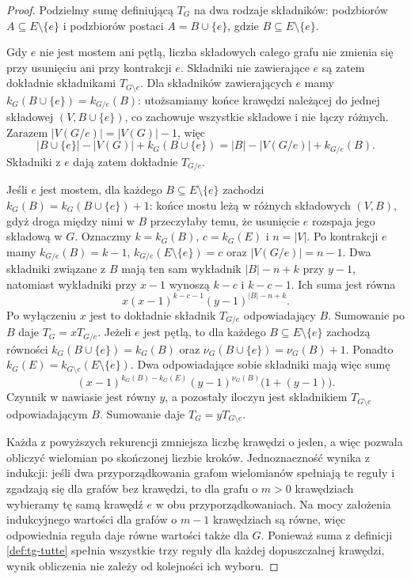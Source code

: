 \begin{proof}
Podzielmy sumę definiującą $T_G$ na dwa rodzaje składników:
podzbiorów $A\subseteq E\setminus\{e\}$ i podzbiorów
postaci $A=B\cup\{e\}$, gdzie $B\subseteq E\setminus\{e\}$.

Gdy $e$ nie jest mostem ani pętlą, liczba składowych całego
grafu nie zmienia się przy usunięciu ani przy kontrakcji $e$.
Składniki nie zawierające $e$ są zatem dokładnie składnikami
$T_{G\setminus e}$. Dla składników zawierających $e$ mamy
$k_G(B\cup\{e\})=k_{G/e}(B)$: utożsamiamy końce
krawędzi należącej do jednej składowej $(V,B\cup\{e\})$,
co zachowuje wszystkie składowe i nie łączy różnych. Zarazem
$|V(G/e)|=|V(G)|-1$, więc
\[
|B\cup\{e\}|-|V(G)|+k_G(B\cup\{e\})
=|B|-|V(G/e)|+k_{G/e}(B).
\]
Składniki z $e$ dają zatem dokładnie $T_{G/e}$.

Jeśli $e$ jest mostem, dla każdego $B\subseteq E\setminus\{e\}$
zachodzi $k_G(B)=k_G(B\cup\{e\})+1$:
końce mostu leżą w różnych składowych $(V,B)$,
gdyż droga między nimi w $B$ przeczyłaby temu,
że usunięcie $e$ rozspaja jego składową w $G$.
Oznaczmy $k=k_G(B)$, $c=k_G(E)$ i $n=|V|$.
Po kontrakcji $e$ mamy $k_{G/e}(B)=k-1$,
$k_{G/e}(E\setminus\{e\})=c$ oraz $|V(G/e)|=n-1$.
Dwa składniki związane z $B$ mają ten sam wykładnik
$|B|-n+k$ przy $y-1$, natomiast wykładniki przy $x-1$
wynoszą $k-c$ i $k-c-1$. Ich suma jest równa
\[
 x(x-1)^{k-c-1}(y-1)^{|B|-n+k}.
\]
Po wyłączeniu $x$ jest to dokładnie składnik $T_{G/e}$
odpowiadający $B$. Sumowanie po $B$ daje $T_G=xT_{G/e}$.
Jeżeli $e$ jest pętlą, to dla każdego
$B\subseteq E\setminus\{e\}$ zachodzą równości
$k_G(B\cup\{e\})=k_G(B)$ oraz
$\nu_G(B\cup\{e\})=\nu_G(B)+1$.
Ponadto $k_G(E)=k_{G\setminus e}(E\setminus\{e\})$.
Dwa odpowiadające sobie składniki mają więc sumę
\[
(x-1)^{k_G(B)-k_G(E)}(y-1)^{\nu_G(B)}
\bigl(1+(y-1)\bigr).
\]
Czynnik w nawiasie jest równy $y$, a pozostały
iloczyn jest składnikiem $T_{G\setminus e}$
odpowiadającym $B$. Sumowanie daje
$T_G=yT_{G\setminus e}$.

Każda z powyższych rekurencji zmniejsza liczbę krawędzi
o jeden, a więc pozwala obliczyć wielomian po skończonej
liczbie kroków. Jednoznaczność wynika z indukcji:
jeśli dwa przyporządkowania grafom wielomianów spełniają
te reguły i zgadzają się dla grafów bez krawędzi,
to dla grafu o $m>0$ krawędziach wybieramy tę samą
krawędź $e$ w obu przyporządkowaniach.
Na mocy założenia indukcyjnego wartości dla grafów
o $m-1$ krawędziach są równe, więc odpowiednia
reguła daje równe wartości także dla $G$.
Ponieważ suma z definicji \ref{def:tg-tutte} spełnia
wszystkie trzy reguły dla każdej dopuszczalnej krawędzi,
wynik obliczenia nie zależy od kolejności ich wyboru.
\end{proof}


